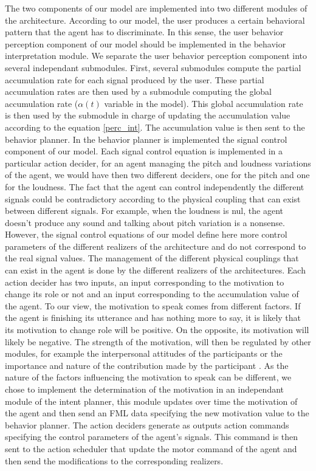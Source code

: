 The two components of our model are implemented into two different modules of the architecture. According to our model, the user produces a certain behavioral pattern that the agent has to discriminate. In this sense, the user behavior perception component of our model should be implemented in the behavior interpretation module. We separate the user behavior perception component into several independant submodules. First, several submodules compute the partial accumulation rate for each signal produced by the user. These partial accumulation rates are then used by a submodule computing the global accumulation rate ($\alpha(t)$ variable in the model). This global accumulation rate is then used by the submodule in charge of updating the accumulation value according to the equation \ref{perc_int}. 
The accumulation value is then sent to the behavior planner. In the behavior planner is implemented the signal control component of our model. Each signal control equation is implemented in a particular action decider, for an agent managing the pitch and loudness variations of the agent, we would have then two different deciders, one for the pitch and one for the loudness. The fact that the agent can control independently the different signals could be contradictory according to the physical coupling that can exist between different signals. For example, when the loudness is nul, the agent doesn't produce any sound and talking about pitch variation is a nonsense. However, the signal control equations of our model define here more control parameters of the different realizers of the architecture and do not correspond to the real signal values. The management of the different physical couplings that can exist in the agent is done by the different realizers of the architectures. 
Each action decider has two inputs, an input corresponding to the motivation to change its role or not and an input corresponding to the accumulation value of the agent. To our view, the motivation to speak comes from different factors.  If the agent is finishing its utterance and has nothing more to say, it is likely that its motivation to change role will be positive. On the opposite, its motivation will likely be negative. The strength of the motivation, will then be regulated by other modules, for example the interpersonal attitudes of the participants \citep{ter_maat_how_2010,ravenet_conversational_2015} or the importance and nature of the contribution made by the participant \citep{cafaro_effects_2016}. As the nature of the factors influencing the motivation to speak can be different, we chose to implement the determination of the motivation in an independant module of the intent planner, this module updates over time the motivation of the agent and then send an FML data specifying the new motivation value to the behavior planner. 
The action deciders generate as outputs action commands specifying the control parameters of the agent's signals. This command is then sent to the action scheduler that update the motor command of the agent and then send the modifications to the corresponding realizers.


